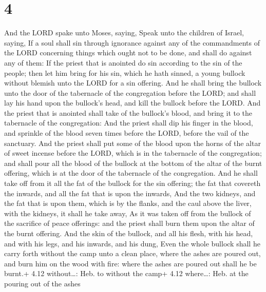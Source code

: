\hypertarget{section-3}{%
\section{4}\label{section-3}}

 And the LORD spake unto Moses, saying,  Speak
unto the children of Israel, saying, If a soul shall sin through
ignorance against any of the commandments of the LORD concerning things
which ought not to be done, and shall do against any of them:
 If the priest that is anointed do sin according to the sin
of the people; then let him bring for his sin, which he hath sinned, a
young bullock without blemish unto the LORD for a sin offering.
 And he shall bring the bullock unto the door of the
tabernacle of the congregation before the LORD; and shall lay his hand
upon the bullock's head, and kill the bullock before the LORD.
 And the priest that is anointed shall take of the bullock's
blood, and bring it to the tabernacle of the congregation: 
And the priest shall dip his finger in the blood, and sprinkle of the
blood seven times before the LORD, before the vail of the sanctuary.
 And the priest shall put some of the blood upon the horns
of the altar of sweet incense before the LORD, which is in the
tabernacle of the congregation; and shall pour all the blood of the
bullock at the bottom of the altar of the burnt offering, which is at
the door of the tabernacle of the congregation.  And he
shall take off from it all the fat of the bullock for the sin offering;
the fat that covereth the inwards, and all the fat that is upon the
inwards,  And the two kidneys, and the fat that is upon
them, which is by the flanks, and the caul above the liver, with the
kidneys, it shall he take away,  As it was taken off from
the bullock of the sacrifice of peace offerings: and the priest shall
burn them upon the altar of the burnt offering.  And the
skin of the bullock, and all his flesh, with his head, and with his
legs, and his inwards, and his dung,  Even the whole
bullock shall he carry forth without the camp unto a clean place, where
the ashes are poured out, and burn him on the wood with fire: where the
ashes are poured out shall he be burnt.+ 4.12 without\ldots: Heb. to
without the camp+ 4.12 where\ldots: Heb. at the pouring out of the ashes

